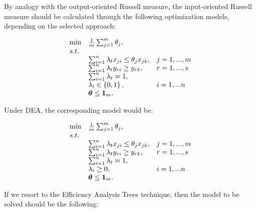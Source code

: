 By analogy with the output-oriented Russell measure, the input-oriented
Russell measure should be calculated through the following optimization
models, depending on the selected approach:

\begin{equation} \label{(23)} 
\begin{array}{lllll} 
{} & {\min } & {\frac{1}{m} \sum_{j=1}^{m}\theta_{j},  } & {} & {} \\ 
{} & {s.t.} & {} & {} & {} \\ 
{} & {} & {\sum_{i=1}^{n}\lambda_{t} x_{ji} \le \theta_{j} x_{jk} ,} & {j=1,...,m} & {} \\ 
{} & {} & {\sum_{i=1}^{n}\lambda_{t} y_{ri} \ge y_{rk} ,} & {r=1,...,s} & {} \\ 
{} & {} & {\sum_{i=1}^{n}\lambda_{t}  =1,} & {} & {} \\ 
{} & {} & {\lambda_{i} \in \left\{0,1\right\},} & {i=1,...n} & {} \\ 
{} & {} & {{\it \boldsymbol{\theta}}\le {\bf 1}_{m}.} 
\end{array}
\end{equation}

Under DEA, the corresponding model would be:

\begin{equation} \label{(24)} 
\begin{array}{lllll} 
{} & {\min } & {\frac{1}{m} \sum_{j=1}^{m}\theta_{j},} & {} & {} \\ 
{} & {s.t.} & {} & {} & {} \\ 
{} & {} & {\sum_{i=1}^{n}\lambda_{t} x_{ji}  \le \theta_{j} x_{jk} ,} & {j=1,...,m} & {} \\ 
{} & {} & {\sum_{i=1}^{n}\lambda_{t} y_{ri}  \ge y_{rk} ,} & {r=1,...,s} & {} \\ 
{} & {} & {\sum_{i=1}^{n}\lambda_{t}=1,} & {} & {} \\ 
{} & {} & {\lambda _{i} \ge 0,} & {i=1,...n} & {} \\ 
{} & {} & {{\it \boldsymbol{\theta}}\le {\bf 1}_{m}.}  
\end{array}
\end{equation}

If we resort to the Efficiency Analysis Trees technique, then the model
to be solved should be the following:

